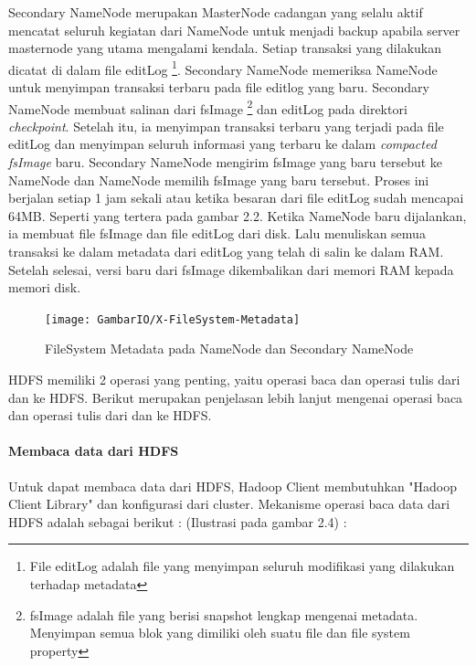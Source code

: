 \begin{enumerate}
			Secondary NameNode merupakan MasterNode cadangan yang selalu aktif mencatat seluruh kegiatan dari NameNode untuk menjadi backup apabila server masternode yang utama mengalami kendala. Setiap transaksi yang dilakukan dicatat di dalam file editLog \footnote{File editLog adalah file yang menyimpan seluruh modifikasi yang dilakukan terhadap metadata}. Secondary NameNode memeriksa NameNode untuk menyimpan transaksi terbaru pada file editlog yang baru. Secondary NameNode membuat salinan dari fsImage \footnote{fsImage adalah file yang berisi snapshot lengkap mengenai metadata. Menyimpan semua blok yang dimiliki oleh suatu file dan file system property} dan editLog pada direktori \textit{checkpoint}. Setelah itu, ia menyimpan transaksi terbaru yang terjadi pada file editLog dan menyimpan seluruh informasi yang terbaru ke dalam \textit{compacted fsImage} baru. Secondary NameNode mengirim fsImage yang baru tersebut ke NameNode dan NameNode memilih fsImage yang baru tersebut. Proses ini berjalan setiap 1 jam sekali atau ketika besaran dari file editLog sudah mencapai 64MB. 
			Seperti yang tertera pada gambar 2.2. Ketika NameNode baru dijalankan, ia membuat file fsImage dan file editLog dari disk. Lalu menuliskan semua transaksi ke dalam metadata dari editLog yang telah di salin ke dalam RAM. Setelah selesai, versi baru dari fsImage dikembalikan dari memori RAM kepada memori disk.
		\end{enumerate}		
		
			
			\begin{figure}[ht]
			\centering
			\texttt{[image: GambarIO/X-FileSystem-Metadata]}
			\caption[FileSystem Metadata pada NameNode dan Secondary NameNode]{FileSystem Metadata pada NameNode dan Secondary NameNode}
			\label{fig:FileSystem Metadata pada NameNode dan Secondary NameNode}
			\end{figure}
			
			HDFS memiliki 2 operasi yang penting, yaitu operasi baca dan operasi tulis dari dan ke HDFS. Berikut merupakan penjelasan lebih lanjut mengenai operasi baca dan operasi tulis dari dan ke HDFS.
		
		\paragraph{Membaca data dari HDFS}
			Untuk dapat membaca data dari HDFS, Hadoop Client membutuhkan "Hadoop Client Library" dan konfigurasi dari cluster. Mekanisme operasi baca data dari HDFS adalah sebagai berikut : (Ilustrasi pada gambar 2.4) : 
			
